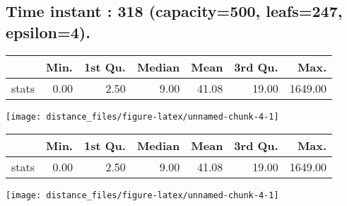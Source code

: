 \documentclass[
  9pt,
  landscape]{article}
\author{}
\date{\vspace{-2.5em}}
\begin{document}
\hypertarget{time-instant-318-capacity500-leafs247-epsilon4.}{%
\subsection{\texorpdfstring{Time instant : 318 (capacity=500, leafs=247,
epsilon=4).\\
}{Time instant : 318 (capacity=500, leafs=247, epsilon=4). }}\label{time-instant-318-capacity500-leafs247-epsilon4.}}

\begin{minipage}{0.5\textwidth}
  \begin{tabular}{rrrrrrr}
    \hline
  & Min. & 1st Qu. & Median & Mean & 3rd Qu. & Max. \\ 
    \hline
  stats & 0.00 & 2.50 & 9.00 & 41.08 & 19.00 & 1649.00 \\ 
    \hline
  \end{tabular}
  \texttt{[image: distance\_files/figure-latex/unnamed-chunk-4-1]} 
\end{minipage}
\begin{minipage}{0.5\textwidth}
  \begin{tabular}{rrrrrrr}
    \hline
  & Min. & 1st Qu. & Median & Mean & 3rd Qu. & Max. \\ 
    \hline
  stats & 0.00 & 2.50 & 9.00 & 41.08 & 19.00 & 1649.00 \\ 
    \hline
  \end{tabular}
  \texttt{[image: distance\_files/figure-latex/unnamed-chunk-4-1]} 
\end{minipage}


\pagebreak
\end{document}
